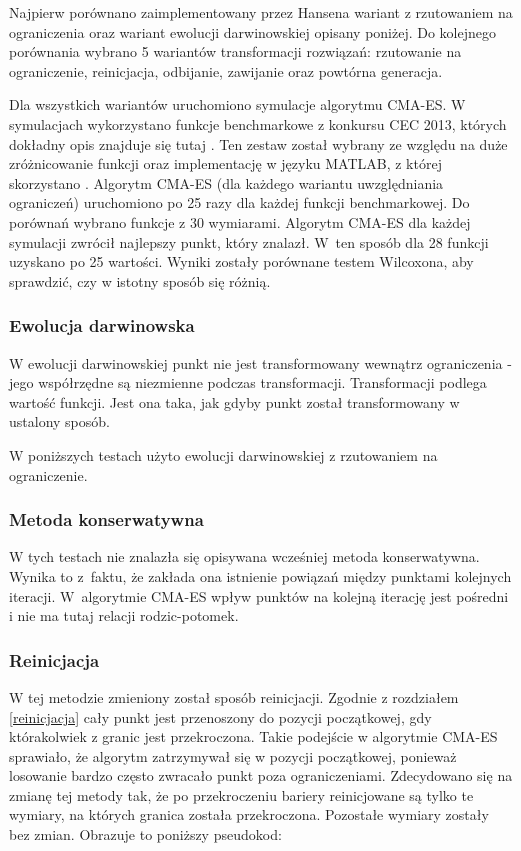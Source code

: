 \documentclass{mini}
\begin{document}
Najpierw porównano zaimplementowany przez Hansena wariant z rzutowaniem na ograniczenia oraz wariant ewolucji darwinowskiej opisany poniżej. Do kolejnego porównania wybrano 5 wariantów transformacji rozwiązań: rzutowanie na ograniczenie, reinicjacja, odbijanie, zawijanie oraz powtórna generacja.

Dla wszystkich wariantów uruchomiono symulacje algorytmu CMA-ES. W symulacjach wykorzystano funkcje benchmarkowe z konkursu CEC 2013, których dokładny opis znajduje się tutaj \cite{cec}. Ten zestaw został wybrany ze względu na duże zróżnicowanie funkcji oraz implementację w języku MATLAB, z której skorzystano \cite{cec_code}. Algorytm CMA-ES (dla każdego wariantu uwzględniania ograniczeń) uruchomiono po 25 razy dla każdej funkcji benchmarkowej. Do porównań wybrano funkcje z 30 wymiarami. Algorytm CMA-ES dla każdej symulacji zwrócił najlepszy punkt, który znalazł. W~ten sposób dla 28 funkcji uzyskano po 25 wartości. Wyniki zostały porównane testem Wilcoxona, aby sprawdzić, czy w istotny sposób się różnią.

\subsubsection*{Ewolucja darwinowska}
\hspace{3,4ex}W ewolucji darwinowskiej punkt nie jest transformowany wewnątrz ograniczenia - jego współrzędne są niezmienne podczas transformacji. Transformacji podlega wartość funkcji. Jest ona taka, jak gdyby punkt został transformowany w ustalony sposób.

W poniższych testach użyto ewolucji darwinowskiej z rzutowaniem na ograniczenie.

\subsubsection*{Metoda konserwatywna}
\hspace{3,4ex}W tych testach nie znalazła się opisywana wcześniej metoda konserwatywna. Wynika to z~faktu, że zakłada ona istnienie powiązań między punktami kolejnych iteracji. W~algorytmie CMA-ES wpływ punktów na kolejną iterację jest pośredni i nie ma tutaj relacji rodzic-potomek.

\subsubsection*{Reinicjacja}
\hspace{3,4ex}W tej metodzie zmieniony został sposób reinicjacji. Zgodnie z rozdziałem \ref{reinicjacja} cały punkt jest przenoszony do pozycji początkowej, gdy którakolwiek z granic jest przekroczona. Takie podejście w algorytmie CMA-ES sprawiało, że algorytm zatrzymywał się w pozycji początkowej, ponieważ losowanie bardzo często zwracało punkt poza ograniczeniami. Zdecydowano się na zmianę tej metody tak, że po przekroczeniu bariery reinicjowane są tylko te wymiary, na których granica została przekroczona. Pozostałe wymiary zostały bez zmian. Obrazuje to poniższy pseudokod:
\end{document}
